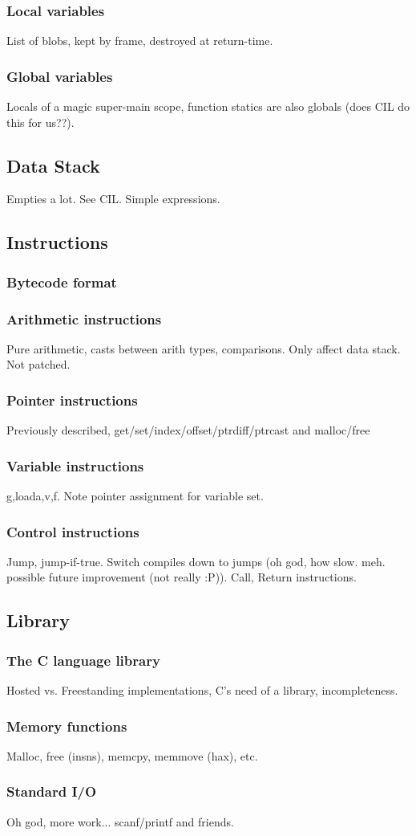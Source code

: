 \subsubsection{Local variables}
List of blobs, kept by frame, destroyed at return-time.
\subsubsection{Global variables}
Locals of a magic super-main scope, function statics are also globals
(does CIL do this for us??).
\subsection{Data Stack}
Empties a lot. See CIL. Simple expressions.
\subsection{Instructions}
\subsubsection{Bytecode format}
\subsubsection{Arithmetic instructions}
Pure arithmetic, casts between arith types, comparisons. Only affect
data stack. Not patched.
\subsubsection{Pointer instructions}
Previously described, get/set/index/offset/ptrdiff/ptrcast and
malloc/free
\subsubsection{Variable instructions}
{g,}load{a,v,f}. Note pointer assignment for variable set.
\subsubsection{Control instructions}
Jump, jump-if-true. Switch compiles down to jumps (oh god, how
slow. meh. possible future improvement (not really :P)). Call, Return
instructions.
\subsection{Library}
\subsubsection{The C language library}
Hosted vs. Freestanding implementations, C's need of a library,
incompleteness.
\subsubsection{Memory functions}
Malloc, free (insns), memcpy, memmove (hax), etc.
\subsubsection{Standard I/O}
Oh god, more work... scanf/printf and friends.
